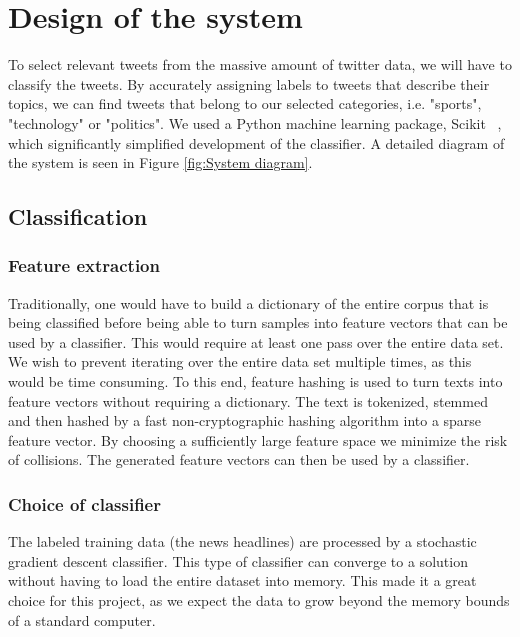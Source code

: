 \documentclass{llncs}
\begin{document}

\section{Design of the system}

To select relevant tweets from the massive amount of twitter data, we will have to classify the tweets. By accurately assigning labels to tweets that describe their topics, we can find tweets that belong to our selected categories, i.e. "sports", "technology" or "politics". We used a Python machine learning package, Scikit ~\cite{scikit-learn}, which significantly simplified development of the classifier. A detailed diagram of the system is seen in Figure \ref{fig:System diagram}. 

\subsection{Classification}

\subsubsection{Feature extraction}
Traditionally, one would have to build a dictionary of the entire corpus that is being classified before being able to turn samples into feature vectors that can be used by a classifier. This would require at least one pass over the entire data set. We wish to prevent iterating over the entire data set multiple times, as this would be time consuming. To this end, feature hashing is used to turn texts into feature vectors without requiring a dictionary. The text is tokenized, stemmed and then hashed by a fast non-cryptographic hashing algorithm into a sparse feature vector. By choosing a sufficiently large feature space we minimize the risk of collisions. The generated feature vectors can then be used by a classifier.

\subsubsection{Choice of classifier}
The labeled training data (the news headlines) are processed by a stochastic gradient descent classifier. This type of classifier can converge to a solution without having to load the entire dataset into memory. This made it a great choice for this project, as we expect the data to grow beyond the memory bounds of a standard computer.
\end{document}
